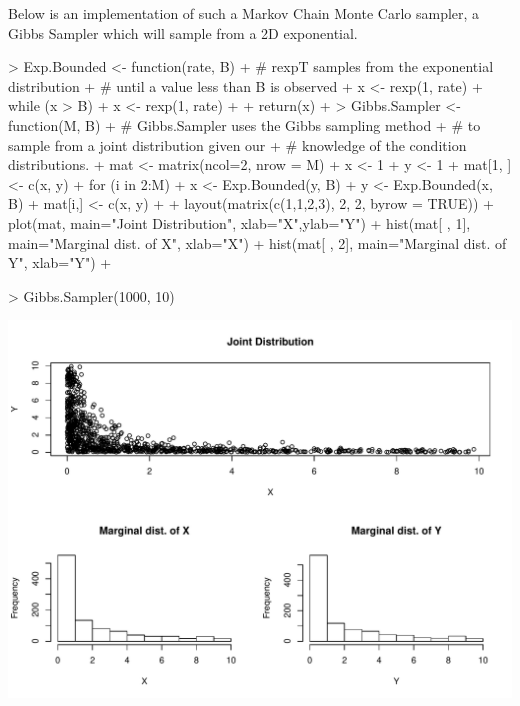 \documentclass[11pt, oneside]{article}     %
\begin{document}
Below is an implementation of such a Markov Chain Monte Carlo sampler, a Gibbs 
Sampler which will sample from a 2D exponential.
\begin{Schunk}
\begin{Sinput}
> Exp.Bounded <- function(rate, B) {
+   # rexpT samples from the exponential distribution
+   # until a value less than B is observed
+   x <- rexp(1, rate)
+   while (x > B) {
+     x <- rexp(1, rate)
+   }
+   return(x)
+ }
> Gibbs.Sampler <- function(M, B) {
+   # Gibbs.Sampler uses the Gibbs sampling method
+   # to sample from a joint distribution given our
+   # knowledge of the condition distributions.
+   mat <- matrix(ncol=2, nrow = M)
+   x <- 1
+   y <- 1
+   mat[1, ] <- c(x, y)
+   for (i in 2:M) {
+       x <- Exp.Bounded(y, B)
+       y <- Exp.Bounded(x, B)
+       mat[i,] <- c(x, y)
+   }
+   layout(matrix(c(1,1,2,3), 2, 2, byrow = TRUE))
+   plot(mat, main="Joint Distribution", xlab="X",ylab="Y")
+   hist(mat[ , 1], main="Marginal dist. of X", xlab="X")
+   hist(mat[ , 2], main="Marginal dist. of Y", xlab="Y")
+ }
\end{Sinput}
\end{Schunk}
\begin{Schunk}
\begin{Sinput}
> Gibbs.Sampler(1000, 10)
\end{Sinput}
\end{Schunk}
\includegraphics{thesis_topic_1-gibbsSampler}
\end{document}
